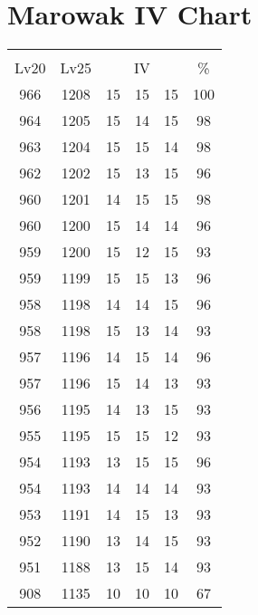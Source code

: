 \documentclass{article}%
\begin{document}
%
\normalsize%
\section{Marowak IV Chart}%
\label{sec:Marowak IV Chart}%
\renewcommand{\arraystretch}{1.5}%
\begin{tabular}{|c|c|c|c|c|c|}%
\hline%
\multicolumn{6}{|c|}{\textcolor{white}{ 
\linebreak{Marowak}
}%
\cellcolor{black}}\\%
\multicolumn{1}{|c}{Lv20}&\multicolumn{1}{c|}{Lv25}&\multicolumn{3}{c|}{IV}&\multicolumn{1}{|c|}{\%}\\%
\hline%
\rowcolor{color100}%
966&1208&15&15&15&100\\%
\hline%
\rowcolor{color98}%
964&1205&15&14&15&98\\%
\hline%
\rowcolor{color98}%
963&1204&15&15&14&98\\%
\hline%
\rowcolor{color96}%
962&1202&15&13&15&96\\%
\hline%
\rowcolor{color98}%
960&1201&14&15&15&98\\%
\hline%
\rowcolor{color96}%
960&1200&15&14&14&96\\%
\hline%
\rowcolor{color93}%
959&1200&15&12&15&93\\%
\hline%
\rowcolor{color96}%
959&1199&15&15&13&96\\%
\hline%
\rowcolor{color96}%
958&1198&14&14&15&96\\%
\hline%
\rowcolor{color93}%
958&1198&15&13&14&93\\%
\hline%
\rowcolor{color96}%
957&1196&14&15&14&96\\%
\hline%
\rowcolor{color93}%
957&1196&15&14&13&93\\%
\hline%
\rowcolor{color93}%
956&1195&14&13&15&93\\%
\hline%
\rowcolor{color93}%
955&1195&15&15&12&93\\%
\hline%
\rowcolor{color96}%
954&1193&13&15&15&96\\%
\hline%
\rowcolor{color93}%
954&1193&14&14&14&93\\%
\hline%
\rowcolor{color93}%
953&1191&14&15&13&93\\%
\hline%
\rowcolor{color93}%
952&1190&13&14&15&93\\%
\hline%
\rowcolor{color93}%
951&1188&13&15&14&93\\%
\hline%
\rowcolor{color91}%
908&1135&10&10&10&67\\%
\end{tabular}

%
\end{document}
